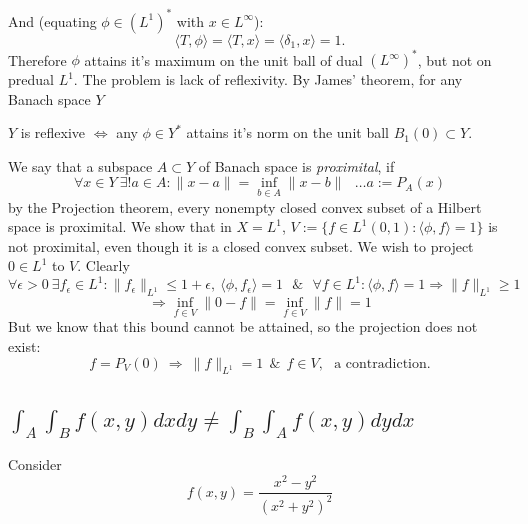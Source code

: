 \documentclass[12pt,a4paper]{article}
\newcommand\nm[1]{\lVert #1 \rVert}
\renewcommand\:{\colon}
\begin{document}
And (equating $\phi\in (L^{1})^{*}$ with $x\in L^{\infty}$):
\begin{equation*}
  \langle T, \phi \rangle = \langle T, x \rangle = \langle \delta_1, x \rangle=1.
\end{equation*}
Therefore $\phi$ attains it's maximum on the unit ball of dual $(L^{\infty})^{*}$, but not on predual $L^{1}$. The problem is lack of reflexivity. By James' theorem, for any Banach space $Y$
\begin{center}
  $Y$ is reflexive $\iff$ any $\phi\in Y^{*}$ attains it's norm on the unit ball $B_1(0)\subset Y.$
\end{center}
We say that a subspace $A\subset Y$ of Banach space is \textit{proximital}, if
\begin{equation*}
	\forall x\in Y \ \exists! a\in A\: \nm{x-a}=\inf_{b\in A}\nm{x-b} \ \ \ \hdots a:=P_A(x)
\end{equation*}
by the Projection theorem, every nonempty closed convex subset of a Hilbert space is proximital. We show that in $X=L^{1}$, $V:=\{f\in L^{1}(0,1)\: \langle \phi, f\rangle=1\}$ is not proximital, even though it is a closed convex subset. We wish to project $0\in L^{1}$ to $V.$ Clearly
\begin{equation*}
	\forall \epsilon>0\ \exists f_\epsilon\in L^{1}\: \nm{f_\epsilon}_{L^{1}}\leq 1+\epsilon , \ \langle \phi, f_\epsilon\rangle=1 \ \ \ \&\ \ \ \forall f\in L^{1}\: \langle \phi, f\rangle=1 \Rightarrow \nm{f}_{L^{1}}\geq 1
\end{equation*}
\begin{equation*}
	\Rightarrow  \inf_{f\in V}\nm{0-f} = \inf_{f\in V}\nm{f} = 1
\end{equation*}
But we know that this bound cannot be attained, so the projection does not exist:
\begin{equation*}
	f= P_V(0)\ \Rightarrow \ \nm{f}_{L^{1}}=1\ \ \& \ \ f\in V, \ \ \ \text{a contradiction.}
\end{equation*}

\subsection{$\int_A \int_B f(x,y)dxdy \neq \int_B \int_A f(x,y)dydx$}
Consider
\begin{equation*}
  f(x,y)=\frac{x^{2}-y^{2}}{(x^{2}+y^{2})^{2}}
\end{equation*}
\end{document}

